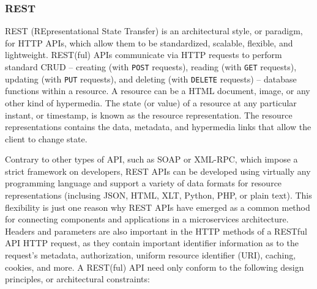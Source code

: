 \documentclass[table, xcdraw]{article}%
\begin{document}
\subsubsection{REST}

REST (REpresentational State Transfer) is an architectural style, or paradigm, for HTTP APIs, which allow them to be standardized, scalable, flexible, and lightweight. REST(ful) APIs communicate via HTTP requests to perform standard CRUD -- creating (with \texttt{POST} requests), reading (with \texttt{GET} requests), updating (with \texttt{PUT} requests), and deleting (with \texttt{DELETE} requests) -- database functions within a resource. A resource can be a HTML document, image, or any other kind of hypermedia. The state (or value) of a resource at any particular instant, or timestamp, is known as the resource representation. The resource representations contains the data, metadata, and hypermedia links that allow the client to change state.

Contrary to other types of API, such as SOAP or XML-RPC, which impose a strict framework on developers, REST APIs can be developed using virtually any programming language and support a variety of data formats for resource representations (inclusing JSON, HTML, XLT, Python, PHP, or plain text). This flexibility is just one reason why REST APIs have emerged as a common method for connecting components and applications in a microservices architecture. Headers and parameters are also important in the HTTP methods of a RESTful API HTTP request, as they contain important identifier information as to the request's metadata, authorization, uniform resource identifier (URI), caching, cookies, and more. A REST(ful) API need only conform to the following design principles, or architectural constraints: 
\end{document}
